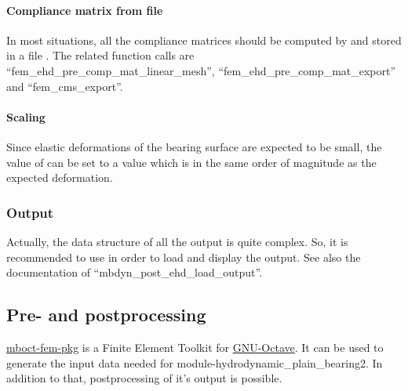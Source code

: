 \paragraph{Compliance matrix from file}
In most situations, all the compliance matrices should be computed by  and stored in a file . The related function calls are ``fem\_ehd\_pre\_comp\_mat\_linear\_mesh'', ``fem\_ehd\_pre\_comp\_mat\_export'' and ``fem\_cms\_export''.
\paragraph{Scaling}
Since elastic deformations of the bearing surface are expected to be small, the value of  can be set to a value which is in the same order of magnitude as the expected deformation.
\subsubsection{Output}
Actually, the data structure of all the output is quite complex. So, it is recommended to use  in order to load and display the output. See also the documentation of ``mbdyn\_post\_ehd\_load\_output''.
\subsection{Pre- and postprocessing}
\href{https://github.com/octave-user/mboct-fem-pkg}{mboct-fem-pkg} is a Finite Element Toolkit for \href{https://gnu.org/software/octave}{GNU-Octave}. It can be used to generate the input data needed for module-hydrodynamic\_plain\_bearing2. In addition to that, postprocessing of it's output is possible.
